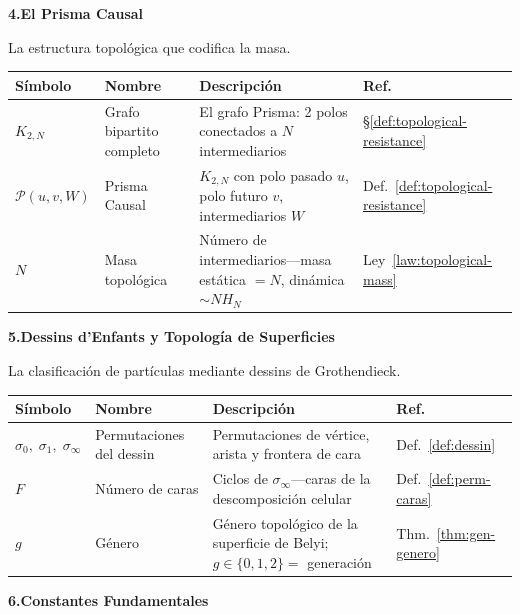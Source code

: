 \documentclass[11pt, a4paper, openany]{book}
\begin{document}
\bigskip

{\bfseries\color{structure} 4.\quad El Prisma Causal}

\smallskip\noindent
La estructura topol\'ogica que codifica la masa.

\smallskip
\begin{tabular}{@{}l@{\;\;}l@{\;\;}p{5.2cm}@{\;\;}l@{}}
\toprule
\textbf{S\'imbolo} & \textbf{Nombre} & \textbf{Descripci\'on} & \textbf{Ref.} \\
\midrule
$K_{2,N}$ & Grafo bipartito completo &
  El grafo Prisma: 2 polos conectados a $N$ intermediarios &
  \S\ref{def:topological-resistance} \\[3pt]
$\mathcal{P}(u,v,W)$ & Prisma Causal &
  $K_{2,N}$ con polo pasado $u$, polo futuro $v$,
  intermediarios $W$ &
  Def.~\ref{def:topological-resistance} \\[3pt]
$N$ & Masa topol\'ogica &
  N\'umero de intermediarios---masa est\'atica $= N$, din\'amica $\sim N H_N$ &
  Ley~\ref{law:topological-mass} \\
\bottomrule
\end{tabular}

\bigskip

{\bfseries\color{structure} 5.\quad Dessins d'Enfants y Topolog\'ia de Superficies}

\smallskip\noindent
La clasificaci\'on de part\'iculas mediante dessins de Grothendieck.

\smallskip
\begin{tabular}{@{}l@{\;\;}l@{\;\;}p{5.2cm}@{\;\;}l@{}}
\toprule
\textbf{S\'imbolo} & \textbf{Nombre} & \textbf{Descripci\'on} & \textbf{Ref.} \\
\midrule
$\sigma_0,\;\sigma_1,\;\sigma_\infty$ & Permutaciones del dessin &
  Permutaciones de v\'ertice, arista y frontera de cara &
  Def.~\ref{def:dessin} \\[3pt]
$F$ & N\'umero de caras &
  Ciclos de $\sigma_\infty$---caras de la descomposici\'on celular &
  Def.~\ref{def:perm-caras} \\[3pt]
$g$ & G\'enero &
  G\'enero topol\'ogico de la superficie de Belyi;
  $g \in \{0,1,2\} ={}$ generaci\'on &
  Thm.~\ref{thm:gen-genero} \\
\bottomrule
\end{tabular}

\bigskip

{\bfseries\color{structure} 6.\quad Constantes Fundamentales}
\end{document}
